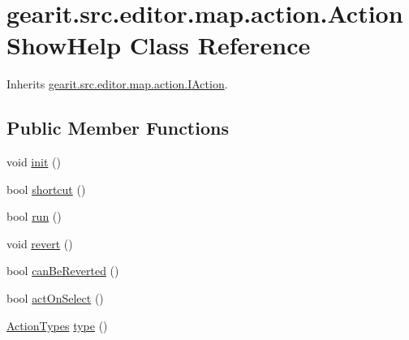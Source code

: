 \hypertarget{classgearit_1_1src_1_1editor_1_1map_1_1action_1_1_action_show_help}{\section{gearit.\+src.\+editor.\+map.\+action.\+Action\+Show\+Help Class Reference}
\label{classgearit_1_1src_1_1editor_1_1map_1_1action_1_1_action_show_help}
}


Inherits \hyperlink{interfacegearit_1_1src_1_1editor_1_1map_1_1action_1_1_i_action}{gearit.\+src.\+editor.\+map.\+action.\+I\+Action}.

\subsection*{Public Member Functions}
\begin{DoxyCompactItemize}
\item 
void \hyperlink{classgearit_1_1src_1_1editor_1_1map_1_1action_1_1_action_show_help_a8f69627627eb55e814a81da1953f57d9}{init} ()
\item 
bool \hyperlink{classgearit_1_1src_1_1editor_1_1map_1_1action_1_1_action_show_help_a73e009bc7080ce65035e4faa1cbae265}{shortcut} ()
\item 
bool \hyperlink{classgearit_1_1src_1_1editor_1_1map_1_1action_1_1_action_show_help_a51ebd4c52bac8edad1eee73b3620721b}{run} ()
\item 
void \hyperlink{classgearit_1_1src_1_1editor_1_1map_1_1action_1_1_action_show_help_acd6884e397b4fd326553225ef682c3af}{revert} ()
\item 
bool \hyperlink{classgearit_1_1src_1_1editor_1_1map_1_1action_1_1_action_show_help_a66e6c1820b1141471b1e867f8adcd8bf}{can\+Be\+Reverted} ()
\item 
bool \hyperlink{classgearit_1_1src_1_1editor_1_1map_1_1action_1_1_action_show_help_a09482a7b7cc179c5b924cca63847bb3d}{act\+On\+Select} ()
\item 
\hyperlink{namespacegearit_1_1src_1_1editor_1_1map_1_1action_af036712a7d960b13d1e31954e65c00e3}{Action\+Types} \hyperlink{classgearit_1_1src_1_1editor_1_1map_1_1action_1_1_action_show_help_a2f87c527daba2730a3bc4c1b26622de3}{type} ()
\end{DoxyCompactItemize}


